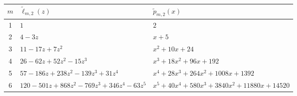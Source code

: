\documentclass[12pt,reqno]{article}
\numberwithin{sfootnote}{section}
\newcommand{\subtableskip}{\bigskip}
\newcommand{\tabletopstrut}[0]{\rule{0pt}{3ex}}
\numberwithin{equation}{section}
\theoremstyle{plain}
\theoremstyle{definition}
\theoremstyle{remark}
\begin{document}
\begin{table}[h] 
\centering 

\smaller 

\begin{subtable}{\textwidth} 
\centering 

\begin{tabular}{|c|l|l|} \hline 
\hline\tabletopstrut 
$m$ & $\widetilde{\ell}_{m,2}(z)$ & $\widetilde{p}_{m,2}(x)$ \\ \hline 
1 & $1$ & $2$ \\ 
2 & $4 - 3z$ & $x+5$ \\ 
3 & $11 - 17z + 7z^2$ & $ x^2+10x+24$ \\ 
4 & $26 - 62z + 52z^2  - 15z^3$ & $x^3+18x^2+96x+192$ \\ 
5 & $57 - 186z + 238z^2 - 139z^3 + 31z^4$ & 
    $x^4+28x^3+264x^2+1008x+1392$ \\ %
6 & $120 - 501z + 868z^2 - 769z^3 + 346z^4 - 63z^5$ & 
    $x^5 + 40x^4+580x^3 + 3840x^2+11880x + 14520$ \\ \hline 
\hline 
\end{tabular} 

\subtableskip 


\end{subtable}
\end{table}
\end{document}
